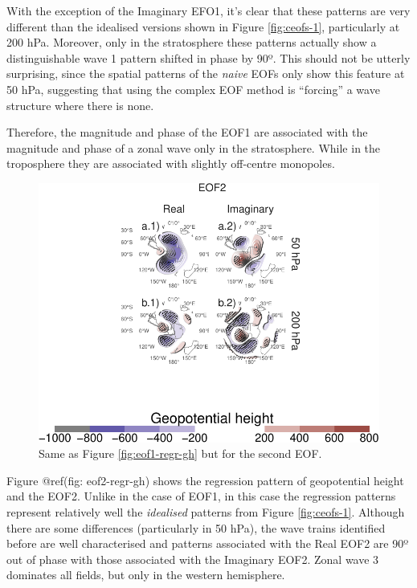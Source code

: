 \documentclass[smallextended]{svjour3}       %
\begin{document}
With the exception of the Imaginary EFO1, it's clear that these patterns are very different than the idealised versions shown in Figure \ref{fig:ceofs-1}, particularly at 200 hPa. Moreover, only in the stratosphere these patterns actually show a distinguishable wave 1 pattern shifted in phase by 90º. This should not be utterly surprising, since the spatial patterns of the \emph{naive} EOFs only show this feature at 50 hPa, suggesting that using the complex EOF method is ``forcing'' a wave structure where there is none.

Therefore, the magnitude and phase of the EOF1 are associated with the magnitude and phase of a zonal wave only in the stratosphere. While in the troposphere they are associated with slightly off-centre monopoles.



\begin{figure}
\centering
\includegraphics{../figures/eof2-regr-gh-1.pdf}
\caption{\label{fig:eof2-regr-gh}Same as Figure \ref{fig:eof1-regr-gh} but for the second EOF.}
\end{figure}

Figure @ref(fig: eof2-regr-gh) shows the regression pattern of geopotential height and the EOF2. Unlike in the case of EOF1, in this case the regression patterns represent relatively well the \emph{idealised} patterns from Figure \ref{fig:ceofs-1}. Although there are some differences (particularly in 50 hPa), the wave trains identified before are well characterised and patterns associated with the Real EOF2 are 90º out of phase with those associated with the Imaginary EOF2. Zonal wave 3 dominates all fields, but only in the western hemisphere.
\end{document}
